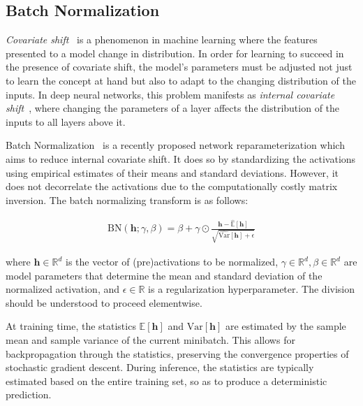 \documentclass{article} %
\newcommand{\vect}[1]{\mathbf{#1}}
\newcommand{\ewprod}{\odot}
\newcommand{\reals}{\mathbb{R}}
\begin{document}
\subsection{Batch Normalization}

\emph{Covariate shift}~\citep{shimodaira2000improving} is a phenomenon in machine learning where
the features presented to a model change in distribution.
In order for learning to succeed in the presence of covariate shift,
the model's parameters must be adjusted not just to learn the concept at hand
but also to adapt to the changing distribution of the inputs.
In deep neural networks, this problem manifests as \emph{internal covariate shift}~\citep{batchnorm},
where changing the parameters of a layer affects the distribution of the inputs to all layers above it.

Batch Normalization~\citep{batchnorm} is a recently proposed network
reparameterization which aims to reduce internal covariate shift.  It does so by
standardizing the activations using empirical estimates of their means and
standard deviations.  However, it does not decorrelate the activations due to
the computationally costly matrix inversion.  The batch normalizing transform
is as follows:

\begin{align}
\mathrm{BN}(\vect{h}; \gamma, \beta) =
  \beta + \gamma \ewprod
  \frac{\vect{h} -   \widehat{\mathbb{E  }}[\vect{h}]}
       {       \sqrt{\widehat{\mathrm{Var}}[\vect{h}] + \epsilon}}
\end{align}

where $\vect{h} \in \reals^d$ is the vector of (pre)activations to be
normalized, $\gamma \in \reals^d, \beta \in \reals^d$ are model parameters that
determine the mean and standard deviation of the normalized activation, and
$\epsilon \in \reals$ is a regularization hyperparameter. The division should
be understood to proceed elementwise.

At training time, the statistics $\mathbb{E}[\vect{h}]$ and
$\mathrm{Var}[\vect{h}]$ are estimated by the sample mean and sample variance
of the current minibatch.  This allows for backpropagation through the
statistics, preserving the convergence properties of stochastic gradient
descent.  During inference, the statistics are typically estimated based on the
entire training set, so as to produce a deterministic prediction.
\end{document}
